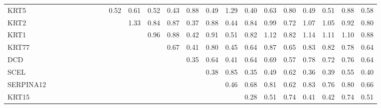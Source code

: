 \begin{longtable}{lrrrrrrrrrrrrrrrrrrrrrr}
KRT5      &               &            &           &           &            &              &              &            &       0.52 &       0.61 &        0.52 &      0.43 &       0.88 &            0.49 &        1.29 &       0.40 &       0.63 &           0.80 &         0.49 &         0.51 &       0.88 &          0.58 \\
KRT2      &               &            &           &           &            &              &              &            &            &       1.33 &        0.84 &      0.87 &       0.37 &            0.88 &        0.44 &       0.84 &       0.99 &           0.72 &         1.07 &         1.05 &       0.92 &          0.80 \\
KRT1      &               &            &           &           &            &              &              &            &            &            &        0.96 &      0.88 &       0.42 &            0.91 &        0.51 &       0.82 &       1.12 &           0.82 &         1.14 &         1.11 &       1.10 &          0.88 \\
KRT77     &               &            &           &           &            &              &              &            &            &            &             &      0.67 &       0.41 &            0.80 &        0.45 &       0.64 &       0.87 &           0.65 &         0.83 &         0.82 &       0.78 &          0.64 \\
DCD       &               &            &           &           &            &              &              &            &            &            &             &           &       0.35 &            0.64 &        0.41 &       0.64 &       0.69 &           0.57 &         0.78 &         0.72 &       0.76 &          0.64 \\
SCEL      &               &            &           &           &            &              &              &            &            &            &             &           &            &            0.38 &        0.85 &       0.35 &       0.49 &           0.62 &         0.36 &         0.39 &       0.55 &          0.40 \\
SERPINA12 &               &            &           &           &            &              &              &            &            &            &             &           &            &                 &        0.46 &       0.68 &       0.81 &           0.62 &         0.83 &         0.76 &       0.80 &          0.66 \\
KRT15     &               &            &           &           &            &              &              &            &            &            &             &           &            &                 &             &       0.28 &       0.51 &           0.74 &         0.41 &         0.42 &       0.74 &          0.51 \\

\end{longtable}
